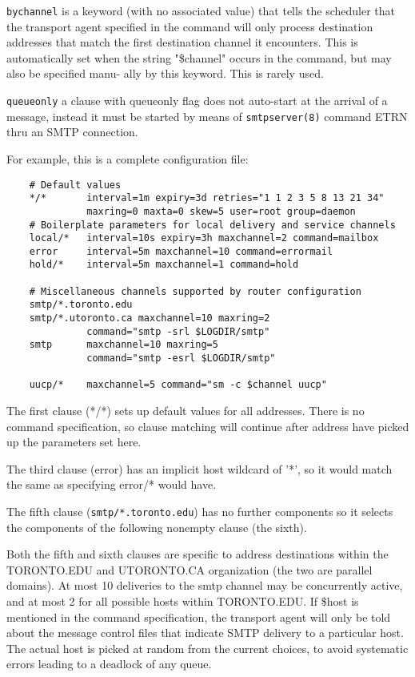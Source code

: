 {\tt bychannel}
is a keyword (with no associated value) that tells  the
scheduler  that  the transport  agent specified in the
command will only process  destination  addresses  that
match  the  first  destination  channel  it encounters.
This is automatically set when  the  string  "\$channel"
occurs  in the command, but may also be specified manu-
ally by this keyword.  This is rarely used.

{\tt queueonly}
a clause with queueonly flag does not auto-start at the
arrival  of  a  message,  instead it must be started by
means of {\tt smtpserver(8)} command ETRN thru an  SMTP  connection.

For example, this is a complete configuration file:

\begin{verbatim}
    # Default values
    */*       interval=1m expiry=3d retries="1 1 2 3 5 8 13 21 34"
              maxring=0 maxta=0 skew=5 user=root group=daemon
    # Boilerplate parameters for local delivery and service channels
    local/*   interval=10s expiry=3h maxchannel=2 command=mailbox
    error     interval=5m maxchannel=10 command=errormail
    hold/*    interval=5m maxchannel=1 command=hold

    # Miscellaneous channels supported by router configuration
    smtp/*.toronto.edu
    smtp/*.utoronto.ca maxchannel=10 maxring=2
              command="smtp -srl $LOGDIR/smtp"
    smtp      maxchannel=10 maxring=5
              command="smtp -esrl $LOGDIR/smtp"

    uucp/*    maxchannel=5 command="sm -c $channel uucp"
\end{verbatim}


The  first  clause  (*/*)  sets up default values for all
addresses.  There is no command specification,  so  clause
matching  will  continue  after address have picked up the
parameters set here.

The third clause (error) has an implicit host wildcard  of
'*',  so  it  would  match  the same as specifying error/*
would have.

The fifth clause ({\tt smtp/*.toronto.edu}) has no further  
components so it selects the components of the following nonempty 
clause (the sixth).

Both the fifth and sixth clauses are specific  to  address
destinations  within the TORONTO.EDU and UTORONTO.CA 
organization (the two  are  parallel  domains).   At  most  10
deliveries to the smtp channel may be concurrently active,
and at most 2 for all possible hosts  within  TORONTO.EDU.
If \$host  is  mentioned in the command specification, the
transport agent will only be told about the  message  control  
files that indicate SMTP delivery to a particular
host. The actual host is picked at random from the  current  
choices, to avoid systematic errors leading to a deadlock of any queue.
















